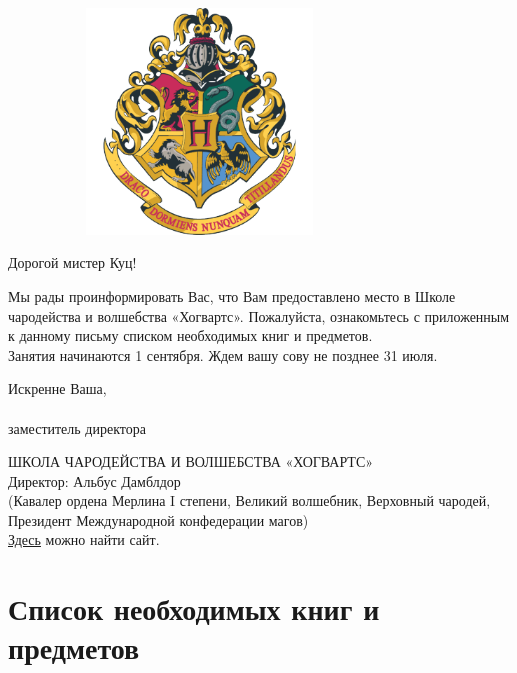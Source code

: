 \documentclass[14pt, a4paper]{article}
\begin{document}
\thispagestyle{empty}

\begin{figure}[t]
\begin{center}
\includegraphics[height=6cm,width=8cm,keepaspectratio]{gerb.png}
\end{center}
\end{figure}

\vspace{1cm}

{ \fontsize{12}{1}\selectfont Дорогой мистер Куц!}

\vspace{2.5cm}

Мы рады проинформировать Вас, что Вам предоставлено место в Школе чародейства и волшебства «Хогвартс». Пожалуйста, ознакомьтесь с приложенным к данному письму списком необходимых книг и предметов. \\
Занятия начинаются 1 сентября. Ждем вашу сову не позднее 31 июля. \par
Искренне Ваша, \\
{} \\
заместитель директора

\vfill
\begin{center}
ШКОЛА ЧАРОДЕЙСТВА И ВОЛШЕБСТВА «ХОГВАРТС»\\
Директор: Альбус Дамблдор\\
(Кавалер ордена Мерлина I степени, Великий волшебник, Верховный чародей, Президент Международной конфедерации магов)\\
\href{http://hogwarts.ru/}{Здесь} можно найти сайт.
\end{center}
\clearpage
\restoregeometry

\section{Список необходимых книг и предметов}
\end{document}
